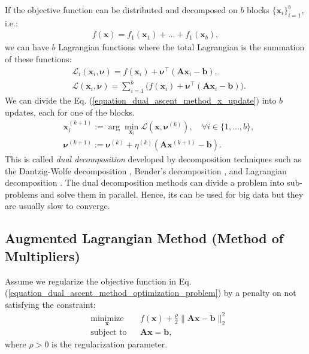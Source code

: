 \documentclass[lang=cn,10pt]{gorgeousnbook}
\numberwithin{equation}{section}%
\numberwithin{figure}{section}%
\begin{document}
If the objective function can be distributed and decomposed on $b$ blocks $\{\boldsymbol{x}_i\}_{i=1}^b$, i.e.:
\begin{align*}
f(\boldsymbol{x}) = f_1(\boldsymbol{x}_1) + \dots + f_1(\boldsymbol{x}_b),
\end{align*}
we can have $b$ Lagrangian functions where the total Lagrangian is the summation of these functions:
\begin{align*}
&\mathcal{L}_i(\boldsymbol{x}_i, \boldsymbol{\nu}) = f(\boldsymbol{x}_i) + \boldsymbol{\nu}^\top (\boldsymbol{A} \boldsymbol{x}_i - \boldsymbol{b}), \\
&\mathcal{L}(\boldsymbol{x}_i, \boldsymbol{\nu}) = \sum_{i=1}^b \big( f(\boldsymbol{x}_i) + \boldsymbol{\nu}^\top (\boldsymbol{A} \boldsymbol{x}_i - \boldsymbol{b}) \big).
\end{align*}
We can divide the Eq. (\ref{equation_dual_ascent_method_x_update}) into $b$ updates, each for one of the blocks. 
\begin{align}
& \boldsymbol{x}_i^{(k+1)} := \arg\min_{\boldsymbol{x}_i} \mathcal{L}(\boldsymbol{x}, \boldsymbol{\nu}^{(k)}), \quad \forall i \in \{1, \dots, b\}, \\
& \boldsymbol{\nu}^{(k+1)} := \boldsymbol{\nu}^{(k)} + \eta^{(k)} (\boldsymbol{A} \boldsymbol{x}^{(k+1)} - \boldsymbol{b}).
\end{align}
This is called \textit{dual decomposition} developed by decomposition techniques such as the Dantzig-Wolfe decomposition \cite{dantzig1960decomposition}, Bender's decomposition \cite{benders1962partitioning}, and Lagrangian decomposition \cite{everett1963generalized}. 
The dual decomposition methods can divide a problem into sub-problems and solve them in parallel. Hence, its can be used for big data but they are usually slow to converge. 

\subsection{Augmented Lagrangian Method (Method of Multipliers)}

Assume we regularize the objective function in Eq. (\ref{equation_dual_ascent_method_optimization_problem}) by a penalty on not satisfying the constraint:
\begin{equation}\label{equation_dual_ascent_method_optimization_problem_regularized}
\begin{aligned}
& \underset{\boldsymbol{x}}{\text{minimize}}
& & f(\boldsymbol{x}) + \frac{\rho}{2} \|\boldsymbol{A} \boldsymbol{x} - \boldsymbol{b}\|_2^2 \\
& \text{subject to}
& & \boldsymbol{A} \boldsymbol{x} = \boldsymbol{b},
\end{aligned}
\end{equation}
where $\rho > 0$ is the regularization parameter. 
\end{document}
